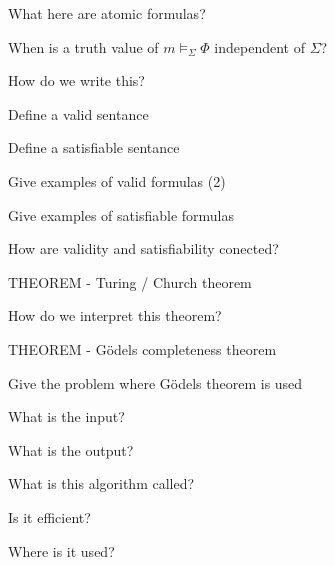 \documentclass[fleqn]{article}
\begin{document}
\begin{enumerate}
\begin{itemize}
    \end{itemize}
    \item What here are atomic formulas?
    \item When is a truth value of $m \models_{\Sigma} \Phi$ independent of $\Sigma$?
    \item How do we write this?
    {\color{green}\item Define a valid sentance}
    \item Define a satisfiable sentance
    {\color{red}\item Give examples of valid formulas (2)}
    {\color{red}\item Give examples of satisfiable formulas}
    \item How are validity and satisfiability conected?
    {\color{red}\item THEOREM - Turing / Church theorem}
    {\color{red}\item How do we interpret this theorem?}
    {\color{red}\item THEOREM  - Gödels completeness theorem}
    {\color{red}\item Give the problem where Gödels theorem is used}
    \begin{itemize}
        {\color{green}\item What is the input?}
        {\color{red}\item What is the output?}
        {\color{red}\item What is this algorithm called?}
        {\color{red}\item Is it efficient?}
        {\color{red}\item Where is it used?}
    \end{itemize}
\end{enumerate}
\end{document}
